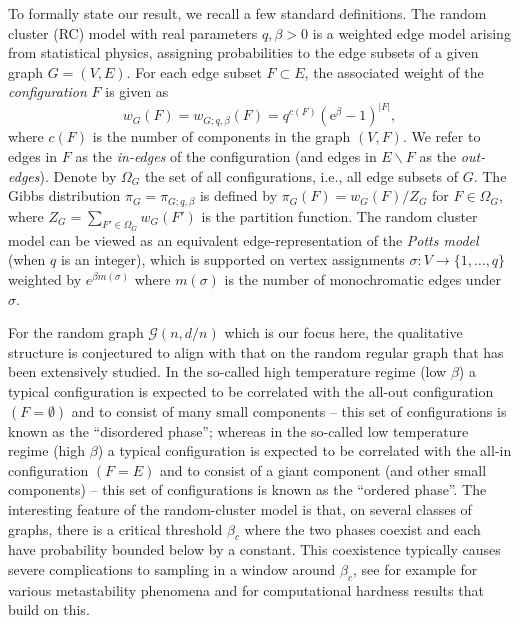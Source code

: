 \documentclass[11pt]{article}
\theoremstyle{plain}
\newcommand{\G}{\mathcal{G}}
\newcommand{\emm}{\mathrm{e}}
\newcommand{\1}{\mathbb{1}}
\begin{document}
To formally state our result, we recall a few standard definitions. The random cluster (RC) model with real parameters \(q,\beta > 0\) is a weighted edge model arising from statistical physics, assigning probabilities to the edge subsets of a given graph \(G = (V, E)\). For each edge subset \(F\subset E\), the associated weight of the \textit{configuration} \(F\) is given as
\[w_G(F)=w_{G;q,\beta}(F) = q^{c(F)} (\emm^\beta-1)^{|F|},\] where \(c(F)\) is the number of components in the graph \((V,F)\). We refer to edges in $F$ as the \emph{in-edges} of the configuration (and edges in $E\backslash F$ as the \emph{out-edges}).  Denote by \(\Omega_G\) the set of all configurations, i.e., all edge subsets of \(G\). The Gibbs distribution  \(\pi_G=\pi_{G;q,\beta}\)  is defined by 
$\pi_G(F) = {w_G(F)}/{Z_G}$ for $F\in \Omega_G,$ where $Z_G = \sum_{F'\in\Omega_G} w_G(F')$ is the partition function. The random cluster model can be viewed as an equivalent edge-representation of the  \textit{Potts model} (when \(q\) is an integer), which is supported on vertex assignments $\sigma:V\rightarrow \{1,\hdots,q\}$ weighted by $e^{\beta m(\sigma)}$ where $m(\sigma)$ is the number of monochromatic edges under $\sigma$.

For the random graph $\G(n,d/n)$ which is our focus here, the qualitative structure is conjectured to align with that on the random regular graph that has been extensively studied. In the so-called high temperature regime (low $\beta$)  a typical configuration is expected to be correlated with the all-out configuration $(F=\emptyset)$ and to consist of many small components -- this set of configurations is known as the ``disordered phase''; whereas in the so-called low temperature regime (high $\beta$) a typical configuration is expected to be correlated with the all-in configuration $(F=E)$ and to consist of a giant component (and other small components) -- this set of configurations is known as the ``ordered phase''. The interesting feature of the random-cluster model is that, on several classes of graphs, there is a critical threshold $\beta_c$ where the two phases coexist and each have probability bounded below by a constant. This coexistence typically causes severe complications to sampling in a window around $\beta_c$, see for example \cite{coja2023,mean1,gore1997swendsen} for various metastability phenomena and \cite{GJ,GSVY,CAI2016690} for computational hardness results that build on this.
\end{document}
